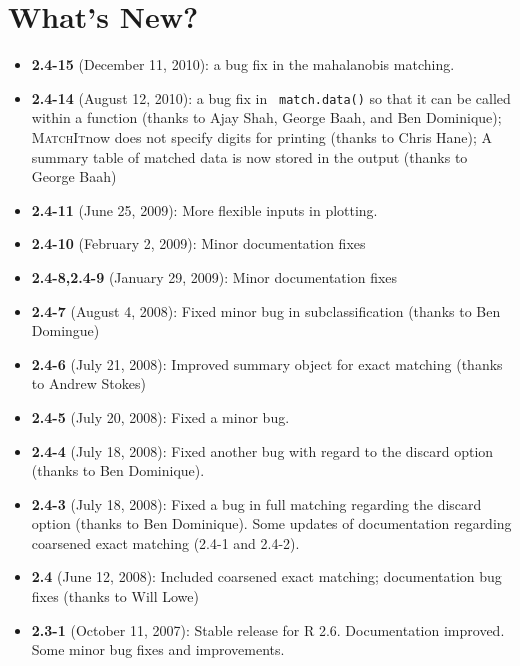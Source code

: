 \documentclass[oneside,letterpaper,12pt]{book}
\newcommand{\MatchIt}{\textsc{MatchIt}}
\begin{document}









\chapter{What's New?}

\begin{itemize}
\item \textbf{2.4-15} (December 11, 2010): a bug fix in the
  mahalanobis matching.
\item \textbf{2.4-14} (August 12, 2010): a bug fix in {\tt
    match.data()} so that it can be called within a function (thanks
  to Ajay Shah, George Baah, and Ben Dominique); \MatchIt now does not
  specify digits for printing (thanks to Chris Hane); A summary table
  of matched data is now stored in the output (thanks to George Baah)
\item \textbf{2.4-11} (June 25, 2009): More flexible inputs in
  plotting.
\item \textbf{2.4-10} (February 2, 2009): Minor documentation fixes
\item \textbf{2.4-8,2.4-9} (January 29, 2009): Minor documentation fixes
\item \textbf{2.4-7} (August 4, 2008): Fixed minor bug in subclassification 
(thanks to Ben Domingue)
\item \textbf{2.4-6} (July 21, 2008): Improved summary object for
  exact matching (thanks to Andrew Stokes)
\item \textbf{2.4-5} (July 20, 2008): Fixed a minor bug.
\item \textbf{2.4-4} (July 18, 2008): Fixed another bug with regard to the discard option (thanks to Ben Dominique).
\item \textbf{2.4-3} (July 18, 2008): Fixed a bug in full matching
  regarding the discard option (thanks to Ben Dominique). Some updates
  of documentation regarding coarsened exact matching (2.4-1 and
  2.4-2).
\item \textbf{2.4} (June 12, 2008): Included coarsened exact matching;
  documentation bug fixes (thanks to Will Lowe)
\item \textbf{2.3-1} (October 11, 2007): Stable release for R
  2.6. Documentation improved. Some minor bug fixes and improvements.

\end{itemize}
\end{document}
